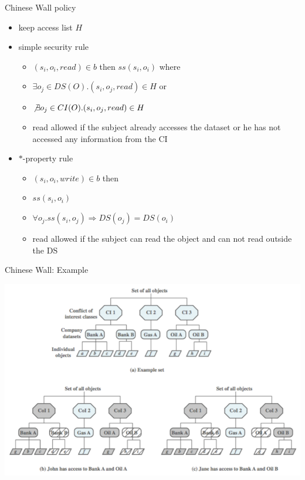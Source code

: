 \documentclass{beamer}
\begin{document}
\begin{frame}{Chinese Wall policy}
  \begin{itemize}
    \item keep access list $H$
    \item simple security rule
      \begin{itemize}
        \item $(s_i, o_i, read) \in b$ then $ss(s_i,o_i)$ where
        \item $\exists o_j \in DS(O). (s_i, o_j, read) \in H$ or
        \item $\not \exists o_j \in CI(O). (s_i, o_j, read) \in H$
        \item read allowed if the subject already accesses the dataset
          or he has not accessed any information from the CI
      \end{itemize}
    \item $*$-property rule
      \begin{itemize}
        \item $(s_i, o_i, write) \in b$ then
        \item $ss(s_i,o_i)$
        \item $\forall o_j.ss(s_i,o_j) \Rightarrow DS(o_j) = DS(o_i)$
        \item read allowed if the subject can read the object and can
          not read outside the DS
      \end{itemize}
  \end{itemize}
\end{frame}

\begin{frame}{Chinese Wall: Example}
  \begin{center}
    \includegraphics[width=0.5\linewidth]{ChineseWall}
  \end{center}
\end{frame}
\end{document}
